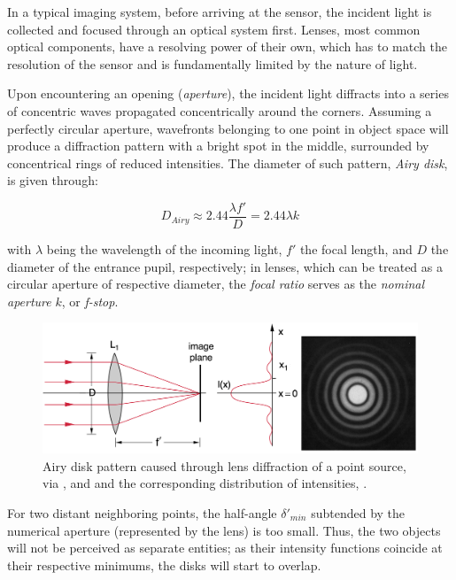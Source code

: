 
In a typical imaging system, before arriving at the sensor, the incident light is collected and focused through an optical system first. Lenses, most common optical components, have a resolving power of their own, which has to match the resolution of the sensor and is fundamentally limited by the nature of light. 

Upon encountering an opening (\textit{aperture}), the incident light diffracts into a series of concentric waves propagated concentrically around the corners. Assuming a perfectly circular aperture, wavefronts belonging to one point in object space will produce a diffraction pattern with a bright spot in the middle, surrounded by concentrical rings of reduced intensities. The diameter of such pattern, \textit{Airy disk}, is given through:

\begin{displaymath}
    D_{Airy} \approx 2.44 \frac{\lambda {f}'}{D} = 2.44 \lambda  k
\end{displaymath}

with $\lambda$ being the wavelength of the incoming light, ${f}'$ the focal length, and $D$ the diameter of the entrance pupil, respectively; in lenses, which can be treated as a circular aperture of respective diameter, the \textit{focal ratio} serves as the \textit{nominal aperture} $k$, or \textit{f-stop}. 

\begin{figure}[h]
  \centering
  \includegraphics[width=\linewidth]{imgs/optics/airy.png}
  \caption{Airy disk pattern caused through lens diffraction of a point source, via \cite{Cagnet1962}, and and the corresponding distribution of intensities, \cite{Demtroeder2018}.}
  \label{fig:airy}
\end{figure}

For two distant neighboring points, the half-angle ${\delta}'_{min}$ subtended by the numerical aperture (represented by the lens) is too small. Thus, the two objects will not be perceived as separate entities; as their intensity functions coincide at their respective minimums, the disks will start to overlap. 

